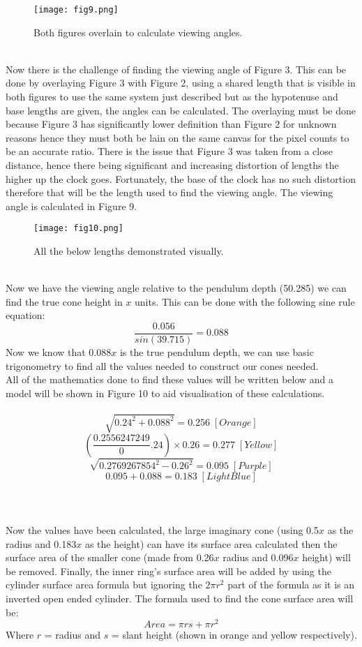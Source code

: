 \documentclass[a4paper,12pt]{article}
\begin{document}
\begin{figure}[h!]
\centering
\texttt{[image: fig9.png]}
\caption{Both figures overlain to calculate viewing angles.}
\label{fig:clock9}
\end{figure} 
\\Now there is the challenge of finding the viewing angle of Figure 3. This can be done by overlaying Figure 3 with Figure 2, using a shared length that is visible in both figures to use the same system just described but as the hypotenuse and base lengths are given, the angles can be calculated. The overlaying must be done because Figure 3 has significantly lower definition than Figure 2 for unknown reasons hence they must both be lain on the same canvas for the pixel counts to be an accurate ratio. There is the issue that Figure 3 was taken from a close distance, hence there being significant and increasing distortion of lengths the higher up the clock goes. Fortunately, the base of the clock has no such distortion therefore that will be the length used to find the viewing angle. The viewing angle is calculated in Figure 9. 
\begin{figure}[h!]
\centering
\texttt{[image: fig10.png]}
\caption{All the below lengths demonstrated visually.}
\label{fig:clock10}
\end{figure}\\Now we have the viewing angle relative to the pendulum depth (50.285\degree ) we can find the true cone height in $x$ units. This can be done with the following sine rule equation: $$\frac{0.056} {sin(39.715)}=0.088$$ Now we know that 0.088$x$ is the true pendulum depth, we can use basic trigonometry to find all the values needed to construct our cones needed. \\All of the mathematics done to find these values will be written below and a model will be shown in Figure 10 to aid visualisation of these calculations. \\\\$$\sqrt{{0.24^2}+{0.088^2}}=0.256\;[Orange]$$
$$(\frac{0.2556247249}0.24)\times0.26=0.277\;[Yellow]$$
$$\sqrt{{0.2769267854^2}-{0.26^2}}=0.095\;[Purple]$$
$$0.095+0.088=0.183\;[Light Blue]$$
\\\\
\\Now the values have been calculated, the large imaginary cone (using 0.5$x$ as the radius and 0.183$x$ as the height) can have its surface area calculated then the surface area of the smaller cone (made from 0.26$x$ radius and 0.096$x$ height) will be removed. Finally, the inner ring's surface area will be added by using the cylinder surface area formula but ignoring the $2\pi r^2$ part of the formula as it is an inverted open ended cylinder. The formula used to find the cone surface area will be: $$Area=\pi r s + \pi r^2$$ Where $r$ = radius and $s$ = slant height (shown in orange and yellow respectively).
\end{document}
